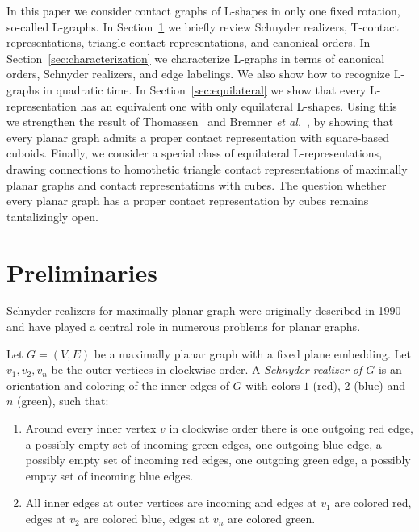 \documentclass{llncs}
\begin{document}
\medskip
{}
In this paper we consider contact graphs of L-shapes in only one fixed rotation, so-called L-graphs.
In Section~\ref{sec:preliminaries} we briefly review Schnyder realizers, T-contact representations, triangle contact representations, and canonical orders.
In Section~\ref{sec:characterization} we characterize L-graphs in terms of canonical orders, Schnyder realizers, and edge labelings.
We also show how to recognize L-graphs in quadratic time.
In Section~\ref{sec:equilateral} we show that every L-representation has an equivalent one with only equilateral L-shapes. Using this we strengthen the result of Thomassen~\cite{Thomassen86} and Bremner {\em et al.}~\cite{cubes12}, by showing that every planar graph admits a proper contact representation with square-based cuboids.
Finally, we consider a special class of equilateral L-representations, drawing connections to homothetic triangle contact representations of maximally planar graphs and contact representations with cubes.
The question whether every planar graph has a proper contact representation by cubes remains tantalizingly open.


\section{Preliminaries}\label{sec:preliminaries}

Schnyder realizers for maximally planar graph were originally described in 1990~\cite{s-epgg-90} and have played a central role in numerous problems for planar graphs.

\begin{definition}
 Let $G =(V,E)$ be a maximally planar graph with a fixed plane embedding. Let $v_1,v_2,v_n$ be the outer vertices in clockwise order. A \emph{Schnyder realizer of $G$} is an orientation and coloring of the inner edges of $G$ with colors $1$ (red), $2$ (blue) and $n$ (green), such that:
 \begin{enumerate}[label =(\roman*)]
  \item Around every inner vertex $v$ in clockwise order there is one outgoing red edge, a possibly empty set of incoming green edges, one outgoing blue edge, a possibly empty set of incoming red edges, one outgoing green edge, a possibly empty set of incoming blue edges.
  \item All inner edges at outer vertices are incoming and edges at $v_1$ are colored red, edges at $v_2$ are colored blue, edges at $v_n$ are colored green.
 \end{enumerate}
\end{definition}
\end{document}
